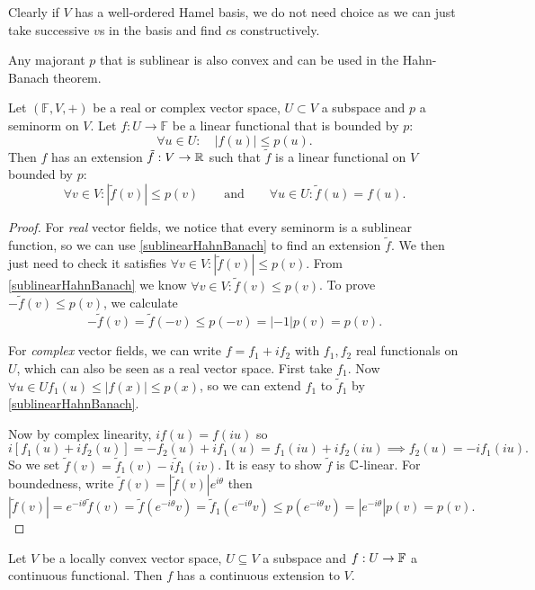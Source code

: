 Clearly if $V$ has a well-ordered Hamel basis, we do not need choice as we can just take successive $v$s in the basis and find $c$s constructively.
\begin{corollary} \label{sublinearHahnBanach}
Any majorant $p$ that is sublinear is also convex and can be used in the Hahn-Banach theorem.
\end{corollary}
\begin{corollary} \label{seminormHahnBanach}
Let $(\mathbb{F},V,+)$ be a real or complex vector space, $U\subset V$ a subspace and $p$ a seminorm on $V$. Let $f:U\to\mathbb{F}$ be a linear functional that is bounded by $p$:
\[ \forall u\in U: \quad |f(u)| \leq p(u). \]
Then $f$ has an extension $\tilde{f}: V\to \mathbb{R}$ such that $\tilde{f}$ is a linear functional on $V$ bounded by $p$:
\[ \forall v\in V: |\tilde{f}(v)| \leq p(v) \qquad \text{and} \qquad \forall u\in U: \tilde{f}(u) = f(u). \]
\end{corollary}
\begin{proof}
For \emph{real} vector fields, we notice that every seminorm is a sublinear function, so we can use \ref{sublinearHahnBanach} to find an extension $\tilde{f}$. We then just need to check it satisfies $\forall v\in V: |\tilde{f}(v)| \leq p(v)$.
From \ref{sublinearHahnBanach} we know $\forall v\in V: \tilde{f}(v) \leq p(v)$.
To prove $-\tilde{f}(v) \leq p(v)$, we calculate
\[ -\tilde{f}(v) = \tilde{f}(-v) \leq p(-v) = |-1|p(v) = p(v). \]

For \emph{complex} vector fields, we can write $f= f_1 + if_2$ with $f_1,f_2$ real functionals on $U$, which can also be seen as a real vector space. First take $f_1$. Now $\forall u\in U f_1(u) \leq |f(x)| \leq p(x)$, so we can extend $f_1$ to $\tilde{f}_1$ by \ref{sublinearHahnBanach}.

Now by complex linearity, $if(u) = f(iu)$ so
\[ i[f_1(u) + if_2(u)] = -f_2(u) + if_1(u) = f_1(iu) + if_2(iu) \implies f_2(u) = -if_1(iu). \]
So we set $\tilde{f}(v) = \tilde{f}_1(v)-i\tilde{f}_1(iv)$. It is easy to show $\tilde{f}$ is $\mathbb{C}$-linear. For boundedness, write $\tilde{f}(v) = |\tilde{f}(v)|e^{i\theta}$ then
\[ |\tilde{f}(v)| = e^{-i\theta}\tilde{f}(v) = \tilde{f}(e^{-i\theta}v) = \tilde{f}_1(e^{-i\theta}v) \leq p(e^{-i\theta}v) = |e^{-i\theta}|p(v) = p(v). \]
\end{proof}
\begin{corollary}
Let $V$ be a locally convex vector space, $U\subseteq V$ a subspace and $f:U\to \mathbb{F}$ a continuous functional. Then $f$ has a continuous extension to $V$.
\end{corollary}
